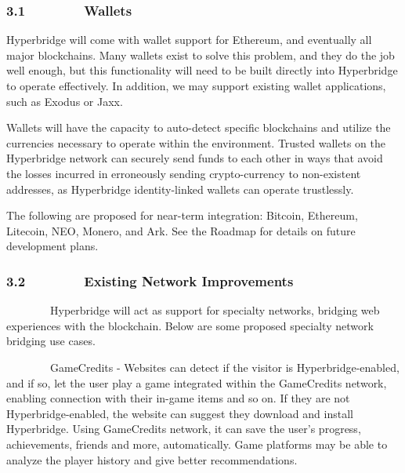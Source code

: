 \documentclass[]{article}
\begin{document}
\hypertarget{h.srw4riftwl36}{%
\subsubsection{\texorpdfstring{{3.1~~~~~~~~Wallets}}{3.1~~~~~~~~Wallets}}\label{h.srw4riftwl36}}

{Hyperbridge will come with wallet support for Ethereum, and eventually
all major blockchains. Many wallets exist to solve this problem, and
they do the job well enough, but this functionality will need to be
built directly into Hyperbridge to operate effectively. In addition, we
may support existing wallet applications, such as Exodus or Jaxx.}

{}

{Wallets will have the capacity to auto-detect specific blockchains and
utilize the currencies necessary to operate within the environment.
Trusted wallets on the Hyperbridge network can securely send funds to
each other in ways that avoid the losses incurred in erroneously sending
crypto-currency to non-existent addresses, as Hyperbridge
identity-linked wallets can operate trustlessly.}

{}

{The following are proposed for near-term integration: Bitcoin,
Ethereum, Litecoin, NEO, Monero, and Ark. See the Roadmap for details on
future development plans.}

\hypertarget{h.8ipfphadgub8}{%
\subsubsection{\texorpdfstring{{3.2~~~~~~~~Existing Network
Improvements}}{3.2~~~~~~~~Existing Network Improvements}}\label{h.8ipfphadgub8}}

{~~~~~~~~Hyperbridge will act as support for specialty networks,
bridging web experiences with the blockchain. Below are some proposed
specialty network bridging use cases.}

{}

{~~~~~~~~GameCredits - Websites can detect if the visitor is
Hyperbridge-enabled, and if so, let the user play a game integrated
within the GameCredits network, enabling connection with their in-game
items and so on. If they are not Hyperbridge-enabled, the website can
suggest they download and install Hyperbridge. Using GameCredits
network, it can save the user's progress, achievements, friends and
more, automatically. Game platforms may be able to analyze the player
history and give better recommendations.}
\end{document}
